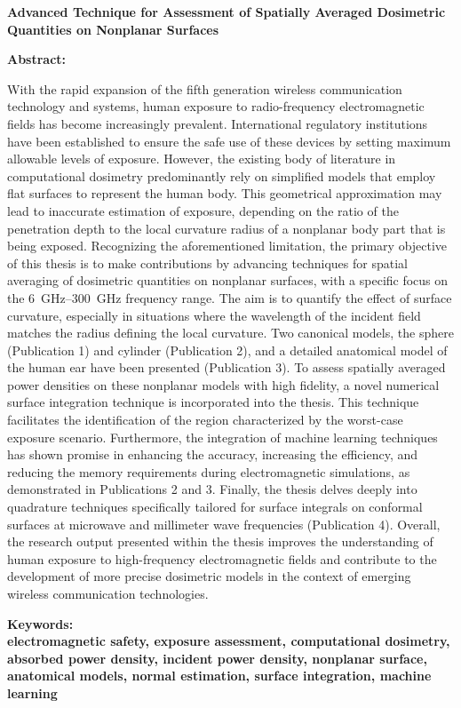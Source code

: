 \setlength{\parindent}{0in}
{\fontsize{14}{18}\bf {Advanced Technique for Assessment of Spatially Averaged Dosimetric Quantities on Nonplanar Surfaces}}

\vskip 15mm
\textbf{Abstract:\\}	
	
\textnormal{With the rapid expansion of the fifth generation wireless communication technology and systems, human exposure to radio-frequency electromagnetic fields has become increasingly prevalent.
International regulatory institutions have been established to ensure the safe use of these devices by setting maximum allowable levels of exposure.
However, the existing body of literature in computational dosimetry predominantly rely on simplified models that employ flat surfaces to represent the human body.
This geometrical approximation may lead to inaccurate estimation of exposure, depending on the ratio of the penetration depth to the local curvature radius of a nonplanar body part that is being exposed.
Recognizing the aforementioned limitation, the primary objective of this thesis is to make contributions by advancing techniques for spatial averaging of dosimetric quantities on nonplanar surfaces, with a specific focus on the \SIrange{6}{300}{\GHz} frequency range.
The aim is to quantify the effect of surface curvature, especially in situations where the wavelength of the incident field matches the radius defining the local curvature.
Two canonical models, the sphere (Publication 1) and cylinder (Publication 2), and a detailed anatomical model of the human ear have been presented (Publication 3).
To assess spatially averaged power densities on these nonplanar models with high fidelity, a novel numerical surface integration technique is incorporated into the thesis.
This technique facilitates the identification of the region characterized by the worst-case exposure scenario.
Furthermore, the integration of machine learning techniques has shown promise in enhancing the accuracy, increasing the efficiency, and reducing the memory requirements during electromagnetic simulations, as demonstrated in Publications 2 and 3.
Finally, the thesis delves deeply into quadrature techniques specifically tailored for surface integrals on conformal surfaces at microwave and millimeter wave frequencies (Publication 4).
Overall, the research output presented within the thesis improves the understanding of human exposure to high-frequency electromagnetic fields and contribute to the development of more precise dosimetric models in the context of emerging wireless communication technologies.
}
	
\vskip 15mm
\bf{Keywords:\\}
\textnormal{electromagnetic safety, exposure assessment, computational dosimetry, absorbed power density, incident power density, nonplanar surface, anatomical models, normal estimation, surface integration, machine learning}
